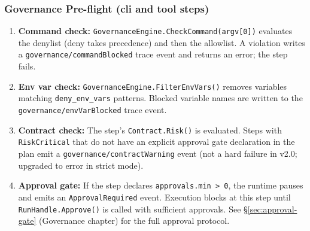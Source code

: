 \subsubsection*{Governance Pre-flight (cli and tool steps)}
\begin{enumerate}
  \item \textbf{Command check:} \texttt{GovernanceEngine.CheckCommand(argv[0])} evaluates
        the denylist (deny takes precedence) and then the allowlist. A violation writes a
        \texttt{governance/commandBlocked} trace event and returns an error; the step fails.
  \item \textbf{Env var check:} \texttt{GovernanceEngine.FilterEnvVars()} removes variables
        matching \texttt{deny\_env\_vars} patterns. Blocked variable names are written to the
        \texttt{governance/envVarBlocked} trace event.
  \item \textbf{Contract check:} The step's \texttt{Contract.Risk()} is evaluated. Steps
        with \texttt{RiskCritical} that do not have an explicit approval gate declaration
        in the plan emit a \texttt{governance/contractWarning} event (not a hard failure in
        v2.0; upgraded to error in strict mode).
  \item \textbf{Approval gate:} If the step declares \texttt{approvals.min > 0}, the runtime
        pauses and emits an \texttt{ApprovalRequired} event. Execution blocks at this step
        until \texttt{RunHandle.Approve()} is called with sufficient approvals.
        See §\ref{sec:approval-gate} (Governance chapter) for the full approval protocol.
\end{enumerate}

